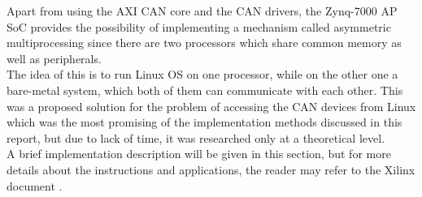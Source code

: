 Apart from using the AXI CAN core and the CAN drivers, the Zynq-7000 AP SoC provides the possibility of implementing a mechanism called asymmetric multiprocessing since there are two processors which share common memory as well as peripherals.
\\
The idea of this is to run Linux OS on one processor, while on the other one a bare-metal system, which both of them can communicate with each other.
This was a proposed solution for the problem of accessing the CAN devices from Linux which was the most promising of the implementation methods discussed in this report, but due to lack of time, it was researched only at a theoretical level.
\\
A brief implementation description will be given in this section, but for more details about the instructions and applications, the reader may refer to the Xilinx document \cite{Xilinx_AMP}.

